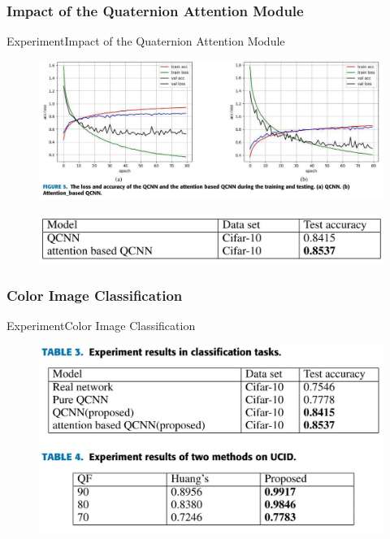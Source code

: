 \documentclass{beamer}
\begin{document}
\subsubsection{Impact of the Quaternion Attention Module}
\begin{frame}{Experiment}{Impact of the Quaternion Attention Module}
    \begin{figure}[H]
        \centering
        \includegraphics[width=\textwidth]{img/7.jpg}
    \end{figure}
    \begin{figure}[H]
        \centering
        \includegraphics[width=\textwidth]{img/8.jpg}
    \end{figure}
\end{frame}

\subsubsection{Color Image Classification}
\begin{frame}{Experiment}{Color Image Classification}
    \begin{figure}[H]
        \centering
        \includegraphics[width=\textwidth]{img/9.jpg}
    \end{figure}
\end{frame}
\end{document}
